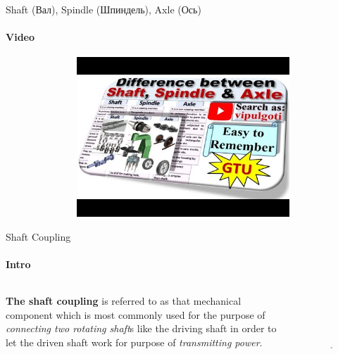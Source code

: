 \documentclass[aspectratio=169]{beamer}
\begin{document}
\begin{frame}[t]{Shaft (Вал), Spindle (Шпиндель), Axle (Ось)}
    \framesubtitle{Video}
    \vspace{-0.6cm}
    \begin{figure}[H]
        \href{https://youtu.be/h04e2MpEHrM?t=219}{
            \centering\includegraphics[height=6cm,width=1\textwidth,keepaspectratio]{shaft_spindel_axle_video.jpg}}
        \label{fig:shaft_spindel_axle_video.jpg}
    \end{figure}
\end{frame}

\begin{frame}[t]{Shaft Coupling}
\framesubtitle{Intro}
    \begin{columns}[T,onlytextwidth]
        \begin{column}{0.49\textwidth}
            \textbf{The shaft coupling} is referred to as that mechanical component which is most commonly used for the purpose of \textit{connecting two rotating shaft}s like the driving shaft in order to let the driven shaft work for purpose of \textit{transmitting power}.
        \end{column}
        \begin{column}{0.49\textwidth}
            \begin{figure}[H]
                \centering\includegraphics[height=4cm,width=1\textwidth,keepaspectratio]{misal_shafts.jpg}
                \label{fig:misal_shafts.jpg}
            \end{figure}
        \end{column}
    \end{columns}
\end{frame}
\end{document}
